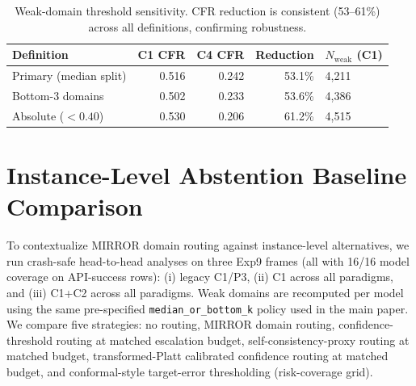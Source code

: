 \documentclass[10pt]{article}
\begin{document}
\begin{table}[h]
\centering
\caption{Weak-domain threshold sensitivity. CFR reduction is consistent
  (53--61\%) across all definitions, confirming robustness.}
\label{tab:threshold}
\small
\begin{tabular}{lrrrl}
\toprule
Definition & C1 CFR & C4 CFR & Reduction & $N_{\text{weak}}$ (C1) \\
\midrule
Primary (median split) & 0.516 & 0.242 & 53.1\% & 4{,}211 \\
Bottom-3 domains & 0.502 & 0.233 & 53.6\% & 4{,}386 \\
Absolute ($< 0.40$) & 0.530 & 0.206 & 61.2\% & 4{,}515 \\
\bottomrule
\end{tabular}
\end{table}

\section{Instance-Level Abstention Baseline Comparison}
\label{app:instance-baselines}

To contextualize MIRROR domain routing against instance-level alternatives, we
run crash-safe head-to-head analyses on three Exp9 frames (all with 16/16 model
coverage on API-success rows): (i) legacy C1/P3, (ii) C1 across all paradigms,
and (iii) C1+C2 across all paradigms. Weak domains are recomputed per model
using the same pre-specified \texttt{median\_or\_bottom\_k} policy used in the
main paper. We compare five strategies: no routing, MIRROR domain routing,
confidence-threshold routing at matched escalation budget, self-consistency-proxy
routing at matched budget, transformed-Platt calibrated confidence routing at
matched budget, and conformal-style target-error thresholding (risk-coverage grid).
\end{document}
